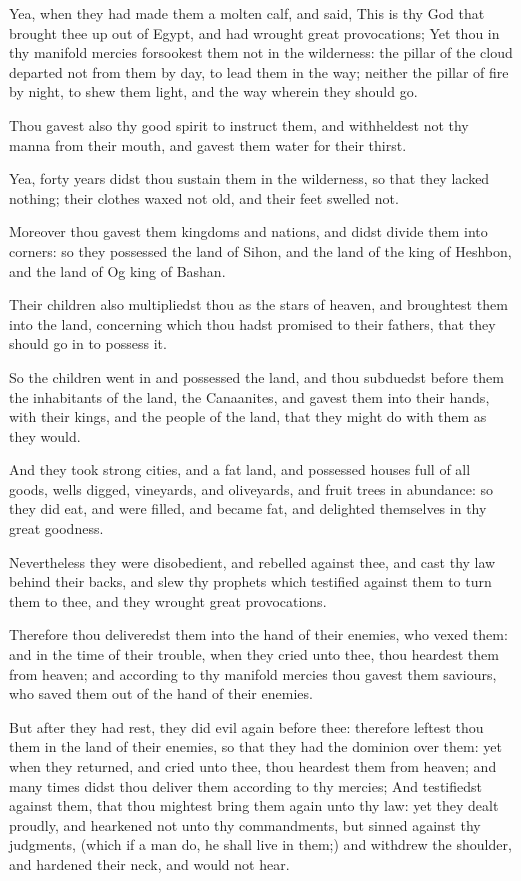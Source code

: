 \Verse Yea, when they had made them a molten calf, and said, This is thy God that brought thee up out of Egypt, and had wrought great provocations; \Verse Yet thou in thy manifold mercies forsookest them not in the wilderness: the pillar of the cloud departed not from them by day, to lead them in the way; neither the pillar of fire by night, to shew them light, and the way wherein they should go.

\Verse Thou gavest also thy good spirit to instruct them, and withheldest not thy manna from their mouth, and gavest them water for their thirst.

\Verse Yea, forty years didst thou sustain them in the wilderness, so that they lacked nothing; their clothes waxed not old, and their feet swelled not.

\Verse Moreover thou gavest them kingdoms and nations, and didst divide them into corners: so they possessed the land of Sihon, and the land of the king of Heshbon, and the land of Og king of Bashan.

\Verse Their children also multipliedst thou as the stars of heaven, and broughtest them into the land, concerning which thou hadst promised to their fathers, that they should go in to possess it.

\Verse So the children went in and possessed the land, and thou subduedst before them the inhabitants of the land, the Canaanites, and gavest them into their hands, with their kings, and the people of the land, that they might do with them as they would.

\Verse And they took strong cities, and a fat land, and possessed houses full of all goods, wells digged, vineyards, and oliveyards, and fruit trees in abundance: so they did eat, and were filled, and became fat, and delighted themselves in thy great goodness.

\Verse Nevertheless they were disobedient, and rebelled against thee, and cast thy law behind their backs, and slew thy prophets which testified against them to turn them to thee, and they wrought great provocations.

\Verse Therefore thou deliveredst them into the hand of their enemies, who vexed them: and in the time of their trouble, when they cried unto thee, thou heardest them from heaven; and according to thy manifold mercies thou gavest them saviours, who saved them out of the hand of their enemies.

\Verse But after they had rest, they did evil again before thee: therefore leftest thou them in the land of their enemies, so that they had the dominion over them: yet when they returned, and cried unto thee, thou heardest them from heaven; and many times didst thou deliver them according to thy mercies; \Verse And testifiedst against them, that thou mightest bring them again unto thy law: yet they dealt proudly, and hearkened not unto thy commandments, but sinned against thy judgments, (which if a man do, he shall live in them;) and withdrew the shoulder, and hardened their neck, and would not hear.

